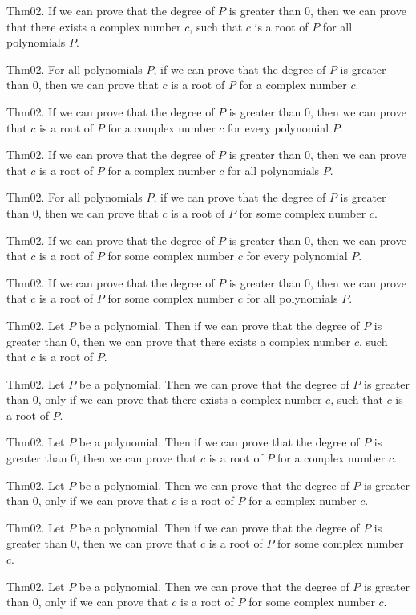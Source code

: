 \documentclass{article}
\begin{document}
Thm02. If we can prove that the degree of $P$ is greater than $0$, then we can prove that there exists a complex number $c$, such that $c$ is a root of $P$ for all polynomials $P$.

Thm02. For all polynomials $P$, if we can prove that the degree of $P$ is greater than $0$, then we can prove that $c$ is a root of $P$ for a complex number $c$.

Thm02. If we can prove that the degree of $P$ is greater than $0$, then we can prove that $c$ is a root of $P$ for a complex number $c$ for every polynomial $P$.

Thm02. If we can prove that the degree of $P$ is greater than $0$, then we can prove that $c$ is a root of $P$ for a complex number $c$ for all polynomials $P$.

Thm02. For all polynomials $P$, if we can prove that the degree of $P$ is greater than $0$, then we can prove that $c$ is a root of $P$ for some complex number $c$.

Thm02. If we can prove that the degree of $P$ is greater than $0$, then we can prove that $c$ is a root of $P$ for some complex number $c$ for every polynomial $P$.

Thm02. If we can prove that the degree of $P$ is greater than $0$, then we can prove that $c$ is a root of $P$ for some complex number $c$ for all polynomials $P$.

Thm02. Let $P$ be a polynomial. Then if we can prove that the degree of $P$ is greater than $0$, then we can prove that there exists a complex number $c$, such that $c$ is a root of $P$.

Thm02. Let $P$ be a polynomial. Then we can prove that the degree of $P$ is greater than $0$, only if we can prove that there exists a complex number $c$, such that $c$ is a root of $P$.

Thm02. Let $P$ be a polynomial. Then if we can prove that the degree of $P$ is greater than $0$, then we can prove that $c$ is a root of $P$ for a complex number $c$.

Thm02. Let $P$ be a polynomial. Then we can prove that the degree of $P$ is greater than $0$, only if we can prove that $c$ is a root of $P$ for a complex number $c$.

Thm02. Let $P$ be a polynomial. Then if we can prove that the degree of $P$ is greater than $0$, then we can prove that $c$ is a root of $P$ for some complex number $c$.

Thm02. Let $P$ be a polynomial. Then we can prove that the degree of $P$ is greater than $0$, only if we can prove that $c$ is a root of $P$ for some complex number $c$.
\end{document}
